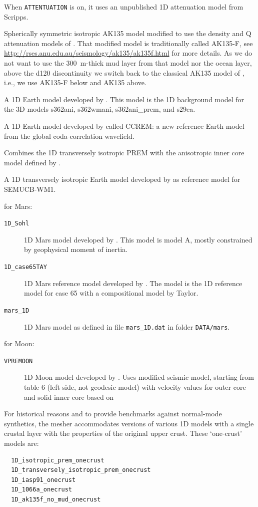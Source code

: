 \begin{description}
\begin{description}
When \texttt{\small ATTENTUATION} is on, it uses an unpublished 1D
attenuation model from Scripps.
%
\item [{\texttt{1D\_ak135f\_no\_mud}}] Spherically symmetric isotropic AK135 model
\citep{KeEnBu95} modified to use the density and Q attenuation models of \cite{MoKe95}.
That modified model is traditionally called AK135-F,
see \url{http://rses.anu.edu.au/seismology/ak135/ak135f.html} for more details.
As we do not want to use the 300~m-thick mud layer from that model nor the ocean layer,
above the d120 discontinuity we switch back to the classical AK135 model of \cite{KeEnBu95},
i.e., we use AK135-F below and AK135 above.
%
\item [{\texttt{1D\_ref}}] A 1D Earth model developed by \citet{KuDzEk06}.
This model is the 1D background model for the 3D models s362ani, s362wmani,
s362ani\_prem, and s29ea.
%
\item [{\texttt{1D\_CCREM}}] A 1D Earth model developed by \citet{Ma2021} called CCREM:
a new reference Earth model from the global coda-correlation wavefield.
%
\item [{\texttt{Ishii}}] Combines the 1D transversely isotropic PREM with the anisotropic inner core model defined by \citet{Ishii2002}.
%
\item [{\texttt{1D\_Berkeley}}] A 1D transversely isotropic Earth model developed by \citet{FrRo2014} as reference model for SEMUCB-WM1.
%
\end{description}
for Mars:
\begin{description}
%
\item [{\texttt{1D\_Sohl}}] 1D Mars model developed by \citet{Sohl1997}.
This model is model A, mostly constrained by geophysical moment of inertia.
%
\item [{\texttt{1D\_case65TAY}}] 1D Mars reference model developed by \citet{Plesa2021}.
The model is the 1D reference model for case 65 with a compositional model by Taylor.
%
\item [{\texttt{mars\_1D}}] 1D Mars model as defined in file \texttt{mars\_1D.dat} in folder \texttt{DATA/mars}.
%
\end{description}
for Moon:
\begin{description}
%
\item [{\texttt{VPREMOON}}] 1D Moon model developed by \citet{Garcia2011}.
Uses modified seismic model, starting from table 6 (left side, not geodesic model) with
velocity values for outer core and solid inner core based on \citet{Weber2011}
%
\end{description}
\end{description}
For historical reasons and to provide benchmarks against normal-mode
synthetics, the mesher accommodates versions of various 1D models
with a single crustal layer with the properties of the original upper
crust. These `one-crust' models are:
\begin{verbatim}
  1D_isotropic_prem_onecrust
  1D_transversely_isotropic_prem_onecrust
  1D_iasp91_onecrust
  1D_1066a_onecrust
  1D_ak135f_no_mud_onecrust
\end{verbatim}

